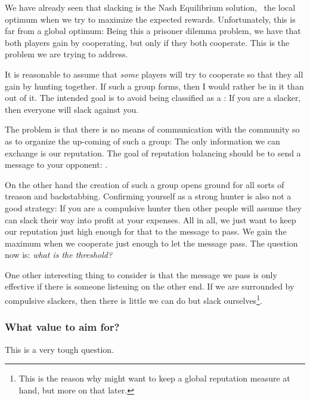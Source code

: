 \documentclass[10pt,fleqn]{article}
\begin{document}
We have already seen that slacking is the Nash Equilibrium solution, \ie\ the
local optimum when we try to maximize the expected rewards. Unfortunately, this
is far from a global optimum: Being this a prisoner dilemma problem, we have
that both players gain by cooperating, but only if they both cooperate. This is
the problem we are trying to address.

It is reasonable to assume that \emph{some} players will try to cooperate so
that they all gain by hunting together. If such a group forms, then I would
rather be in it than out of it. The intended goal is to avoid being classified
as a : If you are a slacker, then everyone will slack against you.

The problem is that there is no means of communication with the community so as
to organize the up-coming of such a group: The only information we can exchange
is our reputation. The goal of reputation balancing should be to send a message
to your opponent: .

On the other hand the creation of such a group opens ground for all sorts of
treason and backstabbing. Confirming yourself as a strong hunter is also not a
good strategy: If you are a compulsive hunter then other people will assume they
can slack their way into profit at your expenses. All in all, we just want to
keep our reputation just high enough for that to the message to pass. We gain
the maximum when we cooperate just enough to let the message pass. The question
now is: \emph{what is the threshold?}

One other interesting thing to consider is that the message we pass is only
effective if there is someone listening on the other end. If we are surrounded
by compulsive slackers, then there is little we can do but slack
ourselves\footnote{This is the reason why might want to keep a global reputation
measure at hand, but more on that later.}.


\subsubsection{What value to aim for?}

This is a very tough question.
\end{document}
